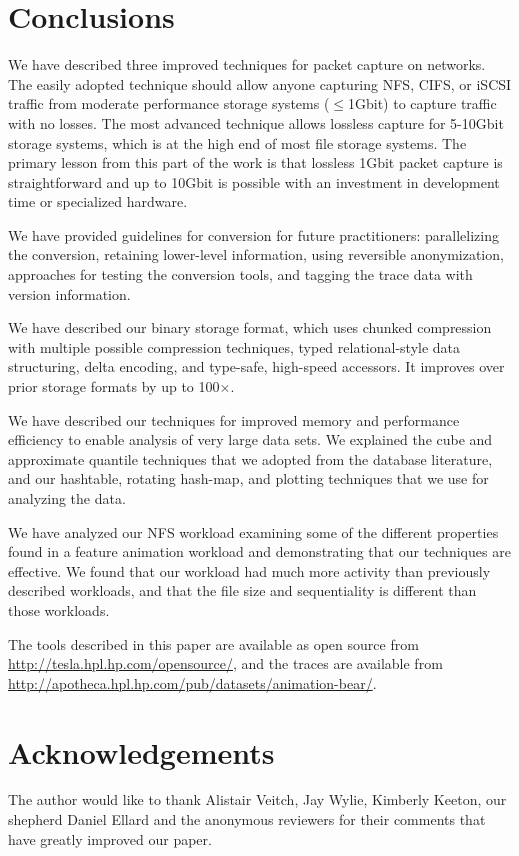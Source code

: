 \section{Conclusions}
\label{sec:conclusion}

We have described three improved techniques for packet capture on
networks.  The easily adopted technique should allow anyone capturing
NFS, CIFS, or iSCSI traffic from moderate performance storage systems
($\leq$1Gbit) to capture traffic with no losses.  The most advanced
technique allows lossless capture for 5-10Gbit storage systems, which
is at the high end of most file storage systems. The primary lesson
from this part of the work is that lossless 1Gbit packet capture is
straightforward and up to 10Gbit is possible with an investment in
development time or specialized hardware.

We have provided guidelines for conversion for future practitioners:
parallelizing the conversion, retaining lower-level information, using
reversible anonymization, approaches for testing the conversion tools,
and tagging the trace data with version information.

We have described our binary storage format, which uses chunked
compression with multiple possible compression techniques, typed
relational-style data structuring, delta encoding, and type-safe,
high-speed accessors.  It improves over prior storage formats by up to
100$\times$.

We have described our techniques for improved memory and performance
efficiency to enable analysis of very large data sets.  We 
explained the cube and approximate quantile techniques that we adopted
from the database literature, and our hashtable, rotating hash-map, and
plotting techniques that we use for analyzing the data.

We have analyzed our NFS workload examining some of the different
properties found in a feature animation workload and demonstrating
that our techniques are effective.  We found that our workload had
much more activity than previously described workloads, and that the
file size and sequentiality is different than those workloads.

The tools described in this paper are available as open source from 
\url{http://tesla.hpl.hp.com/opensource/}, and the traces are available
from \url{http://apotheca.hpl.hp.com/pub/datasets/animation-bear/}.

\section{Acknowledgements}

The author would like to thank Alistair Veitch, Jay Wylie, Kimberly
Keeton, our shepherd Daniel Ellard and the anonymous reviewers for
their comments that have greatly improved our paper.

